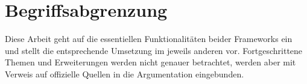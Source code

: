 \section{Begriffsabgrenzung}

Diese Arbeit geht auf die essentiellen Funktionalitäten beider Frameworks ein und stellt die entsprechende Umsetzung im jeweils
anderen vor. Fortgeschrittene Themen und Erweiterungen werden nicht genauer betrachtet, werden aber mit Verweis auf offizielle Quellen
in die Argumentation eingebunden.